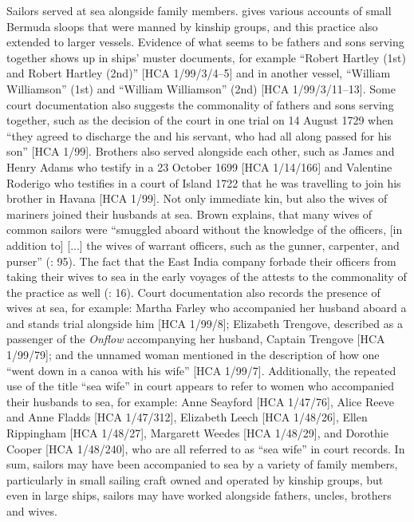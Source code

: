   Sailors served at sea alongside family members. \citet{Jarvis2010} gives various accounts of small Bermuda sloops that were manned by kinship groups, and this practice also extended to larger vessels. Evidence of what seems to be fathers and sons serving together shows up in ships’ muster documents, for example “Robert Hartley (1st) and Robert Hartley (2nd)” [HCA 1/99/3/4–5] and in another vessel, “William Williamson” (1st) and “William Williamson” (2nd) [HCA 1/99/3/11–13]. Some court documentation also suggests the commonality of fathers and sons serving together, such as the decision of the court in one  trial on 14 August {1729} when “they agreed to discharge the  and his servant, who had all along passed for his son” [HCA 1/99].  Brothers also served alongside each other, such as James and Henry Adams who testify in a  23 October {1699} [HCA 1/14/166] and Valentine Roderigo who testifies in a court of  Island 1722 that he was travelling to join his brother in Havana [HCA 1/99]. Not only immediate kin, but also the wives of mariners joined their husbands at sea. Brown explains, that many wives of common sailors were “smuggled aboard without the knowledge of the officers, [in addition to] [...] the wives of warrant officers, such as the gunner, carpenter, and purser” (\citealt{Brown2011}: 95). The fact that the East India company forbade their officers from taking their wives to sea in the early voyages of the  attests to the commonality of the practice as well (\citealt{Fury2015}: 16). Court documentation also records the presence of wives at sea, for example: Martha Farley who accompanied her husband aboard a  and stands trial alongside him [HCA 1/99/8]; Elizabeth Trengove, described as a passenger of the \textit{Onflow} accompanying her husband, Captain Trengove [HCA 1/99/79]; and the unnamed woman mentioned in the description of how one  “went down in a canoa with his wife” [HCA 1/99/7]. Additionally, the repeated use of the title “sea wife” in court appears to refer to women who accompanied their husbands to sea, for example: Anne Seayford [HCA 1/47/76], Alice Reeve and Anne Fladds [HCA 1/47/312], Elizabeth Leech [HCA 1/48/26], Ellen Rippingham [HCA 1/48/27], Margarett Weedes [HCA 1/48/29], and Dorothie Cooper [HCA 1/48/240], who are all referred to as “sea wife” in court records. In sum, sailors may have been accompanied to sea by a variety of family members, particularly in small sailing craft owned and operated by kinship groups, but even in large ships, sailors may have worked alongside fathers, uncles, brothers and wives. 

